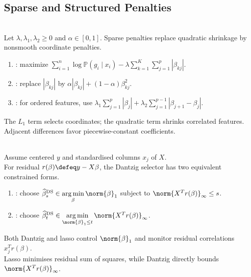 \subsection{Sparse and Structured Penalties}
\begin{method} \label{meth:sl-sparse-and-structured-high-dimensional-penalties} \\
Let $\lambda,\lambda_1,\lambda_2\geq0$ and $\alpha\in[0,1]$. Sparse penalties replace quadratic shrinkage by nonsmooth coordinate penalties.
\begin{enumerate}[label=(\roman*)]
\setlength{\itemsep}{0pt}
\item {}: maximize $\sum\limits_{i=1}^n\log\mathbb{P}(g_i\mid x_i)-\lambda\sum\limits_{k=1}^K\sum\limits_{j=1}^p|\beta_{kj}|$.
\item {}: replace $|\beta_{kj}|$ by $\alpha|\beta_{kj}|+(1-\alpha)\beta_{kj}^2$.
\item {}: for ordered features, use $\lambda_1\sum\limits_{j=1}^p|\beta_j|+\lambda_2\sum\limits_{j=1}^{p-1}|\beta_{j+1}-\beta_j|$.
\end{enumerate}
The $L_1$ term selects coordinates; the quadratic term shrinks correlated features.\\
Adjacent differences favor piecewise-constant coefficients.
\end{method}

\begin{method} \label{meth:sl-dantzig-selector} \\
Assume centered $y$ and standardised columns $x_j$ of $X$.\\
For residual $r(\beta)\defeq y-X\beta$, the Dantzig selector has two equivalent constrained forms.
\begin{enumerate}[label=(\roman*)]
\setlength{\itemsep}{0pt}
\item {}: choose $\widehat{\beta}^{\mathrm{DS}}_s\in\operatorname*{arg\,min}\limits_{\beta}\norm{\beta}_1$ subject to $\norm{X^Tr(\beta)}_\infty\leq s$.
\item {}: choose $\widehat{\beta}^{\mathrm{DS}}_t\in\operatorname*{arg\,min}\limits_{\norm{\beta}_1\leq t}\norm{X^Tr(\beta)}_\infty$.
\end{enumerate}
Both Dantzig and lasso control $\norm{\beta}_1$ and monitor residual correlations $x_j^Tr(\beta)$.\\
Lasso minimises residual sum of squares, while Dantzig directly bounds $\norm{X^Tr(\beta)}_\infty$.
\end{method}

